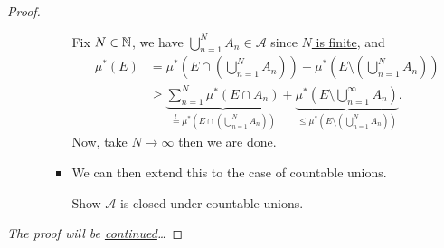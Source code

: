 \begin{proof}
\begin{enumerate}
\begin{enumerate}
\begin{itemize}
\begin{explanation}
					                  Fix \(N\in\mathbb{\MakeUppercase{N}} \), we have \(\bigcup\limits_{n=1}^{N} A_{n}\in \mathcal{A} \) since \hyperref[pf:Caratheodory-extension-Thm-1-finite-unions]{\(N\) is finite}, and
					                  \[
						                  \begin{split}
							                  \mu^{*} (E) &= \mu^{*} \left(E\cap \left(\bigcup\limits_{n=1}^{N} A_{n}\right)\right) + \mu^{*} \left(E\setminus \left(\bigcup\limits_{n=1}^{N} A_{n}\right)\right)\\
							                  &\geq \underbrace{\sum\limits_{n=1}^{N} \mu^{*} (E\cap A_{n})}_{ \overset{\hyperref[lma:disjoint-C-measurable-finite-additive]{!}}{=} \mu^{*} \left(E\cap \left(\bigcup\limits_{n=1}^{N} A_{n}\right)\right)} + \underbrace{\mu^{*} \left(E\setminus \bigcup\limits_{n=1}^{\infty} A_{n}\right)}_{\leq \mu^{*} \left(E\setminus \left(\bigcup\limits_{n=1}^{N} A_{n}\right)\right)}.
						                  \end{split}
					                  \]
					                  Now, take \(N\to \infty \) then we are done.
				                  \end{explanation}
				            \item We can then extend this to the case of countable unions.
				                  \begin{exercise}
					                  Show \(\mathcal{A} \) is closed under countable unions.
				                  \end{exercise}
				                  \begin{answer}
				                  \end{answer}
			            \end{itemize}
		      \end{enumerate}
	\end{enumerate}
	\emph{The proof will be \hyperref[pf:Caratheodory-extension-Thm-cont]{continued}\ldots}
\end{proof}
